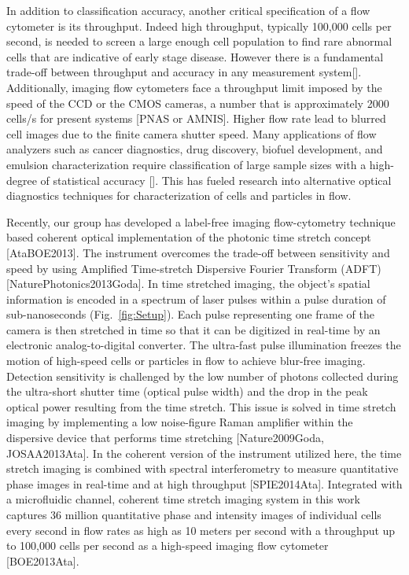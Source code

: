 \documentclass[aps,pra,reprint,superscriptaddress]{revtex4-1}
\begin{document}
In addition to classification accuracy, another critical specification of a flow cytometer is its throughput. Indeed high throughput, typically 100,000 cells per second, is needed to screen a large enough cell population to find rare abnormal cells that are indicative of early stage disease. However there is a fundamental trade-off between throughput and accuracy in any measurement system[]. Additionally, imaging flow cytometers face a throughput limit imposed by the speed of the CCD or the CMOS cameras, a number that is approximately 2000 cells/s for present systems [PNAS or AMNIS]. Higher flow rate lead to blurred cell images due to the finite camera shutter speed. Many applications of flow analyzers such as cancer diagnostics, drug discovery, biofuel development, and emulsion characterization require classification of large sample sizes with a high-degree of statistical accuracy []. This has fueled research into alternative optical diagnostics techniques for characterization of cells and particles in flow.

Recently, our group has developed a label-free imaging flow-cytometry technique based coherent optical implementation of the photonic time stretch concept [AtaBOE2013]. The instrument overcomes the trade-off between sensitivity and speed by using Amplified Time-stretch Dispersive Fourier Transform (ADFT) [NaturePhotonics2013Goda]. In time stretched imaging, the object’s spatial information is encoded in a spectrum of laser pulses within a pulse duration of sub-nanoseconds (Fig.~\ref{fig:Setup}). Each pulse representing one frame of the camera is then stretched in time so that it can be digitized in real-time by an electronic analog-to-digital converter. The ultra-fast pulse illumination freezes the motion of high-speed cells or particles in flow to achieve blur-free imaging. Detection sensitivity is challenged by the low number of photons collected during the ultra-short shutter time (optical pulse width) and the drop in the peak optical power resulting from the time stretch. This issue is solved in time stretch imaging by implementing a low noise-figure Raman amplifier within the dispersive device that performs time stretching [Nature2009Goda, JOSAA2013Ata]. In the coherent version of the instrument utilized here, the time stretch imaging is combined with spectral interferometry to measure quantitative phase images in real-time and at high throughput [SPIE2014Ata]. Integrated with a microfluidic channel, coherent time stretch imaging system in this work captures 36 million quantitative phase and intensity images of individual cells every second in flow rates as high as 10 meters per second with a throughput up to 100,000 cells per second as a high-speed imaging flow cytometer [BOE2013Ata].
\end{document}
